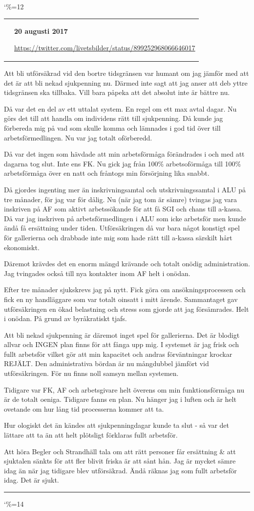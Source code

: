 \documentclass[a4paper]{article}
\makeatletter
\newcommand{\entry}{
\catcode`\%=12
\@entry}
\newcommand{\@entry}[3]{
\bigskip
\begin{tabular*}{\textwidth}{l m{\textwidth-4cm}}
\qrcode{#3} & \textbf{#1}

\medskip

\url{#3}

\end{tabular*}

\medskip


\begin{multicols}{2}
#2
\end{multicols}

\medskip
\hrule

\catcode`\%=14
}
\makeatother
\begin{document}
\entry{20 augusti 2017}{Att bli utförsäkrad vid den bortre tidsgränsen var humant om jag jämför med att det är att bli nekad sjukpenning nu.
Därmed inte sagt att jag anser att deb yttre tidsgränsen ska tillbaka. Vill bara påpeka att det absolut inte är bättre nu.

Då var det en del av ett uttalat system. En regel om ett max avtal dagar. Nu görs det till att handla om individens rätt till sjukpenning. Då kunde jag förbereda mig på vad som skulle komma och lämnades i god tid över till arbetsförmedlingen. Nu var jag totalt oförberedd.

Då var det ingen som hävdade att min arbetsförmåga förändrades i och med att dagarna tog slut. Inte ens FK. Nu gick jag från 100\% arbetsoförmåga  till 100\% arbetsförmåga över en natt och fråntogs min försörjning lika snabbt.

Då gjordes ingenting mer än inskrivningsamtal och utskrivningssamtal i ALU på tre månader, för jag var för dålig. Nu (när jag tom är sämre) tvingas jag vara inskriven på AF som aktivt arbetssökande för att få SGI och chans till a-kassa. Då var jag inskriven på arbetsförmedlingen i ALU som icke arbetsför men kunde ändå få ersättning under tiden.
Utförsäkringen då var bara något konstigt spel för gallerierna och drabbade inte mig som hade rätt till a-kassa särskilt hårt ekonomiskt.

Däremot krävdes det en enorm mängd krävande och totalt onödig administration. Jag tvingades också till nya kontakter inom AF helt i onödan.

Efter tre månader sjukskrevs jag på nytt. Fick göra om ansökningsprocessen och fick en ny handläggare som var totalt oinsatt i mitt ärende.
Sammantaget gav utförsäkringen en ökad belastning och stress som gjorde att jag försämrades. Helt i onödan. På grund av byråkratiskt tjafs.

Att bli nekad sjukpenning är däremot inget spel för gallerierna. Det är blodigt allvar och INGEN plan finns för att fånga upp mig.
I systemet är jag frisk och fullt arbetsför vilket gör att min kapacitet och andras förväntningar krockar REJÄLT.
Den administrativa bördan är nu mångdubbel jämfört vid utförsäkringen. För nu finns noll samsyn mellan systemen.

Tidigare var FK, AF och arbetsgivare helt överens om min funktionsförmåga nu är de totalt oeniga.
Tidigare fanns en plan. Nu hänger jag i luften och är helt ovetande om hur lång tid processerna kommer att ta.

Hur ologiskt det än kändes att sjukpenningdagar kunde ta slut - så var det lättare att ta än att helt plötsligt förklaras fullt arbetsför.

Att höra Begler och Strandhäll tala om att rätt personer får ersättning \& att sjuktalen sänkts för att fler blivit friska är att sånt hån.
Jag är mycket sämre idag än när jag tidigare blev utförsäkrad. Ändå räknas jag som fullt arbetsför idag. Det är sjukt.}{https://twitter.com/livetsbilder/status/899252968066646017}
\end{document}
